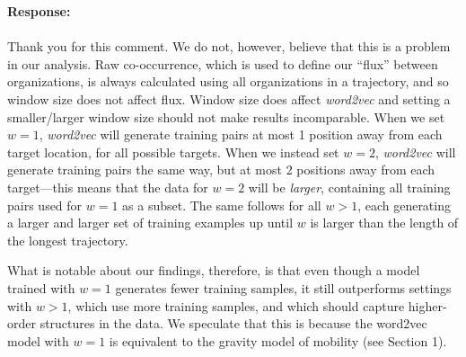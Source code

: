 \documentclass[12pt,draft,a4paper]{article}
\newcounter{comment}[subsection]
\newcommand{\response}[1]{{\noindent \textbf{Response:} \\ \\ \noindent #1}}
\begin{document}
\response{
	Thank you for this comment.
	We do not, however, believe that this is a problem in our analysis.
	Raw co-occurrence, which is used to define our ``flux'' between organizations, is always calculated using all organizations in a trajectory, and so window size does not affect flux.
	Window size does affect \textit{word2vec} and setting a smaller/larger window size should not make results incomparable.
	When we set $w = 1$, \textit{word2vec} will generate training pairs at most 1 position away from each target location, for all possible targets.
	When we instead set $w = 2$, \textit{word2vec} will generate training pairs the same way, but at most 2 positions away from each target---this means that the data for $w = 2$ will be \textit{larger}, containing all training pairs used for $w = 1$ as a subset.
	The same follows for all $w > 1$, each generating a larger and larger set of training examples up until $w$ is larger than the length of the longest trajectory.

	What is notable about our findings, therefore, is that even though a model trained with $w = 1$ generates fewer training samples, it still outperforms settings with $w > 1$, which use more training samples, and which should capture higher-order structures in the data.
	We speculate that this is because the word2vec model with $w = 1$ is equivalent to the gravity model of mobility (see Section 1).
}
\end{document}
